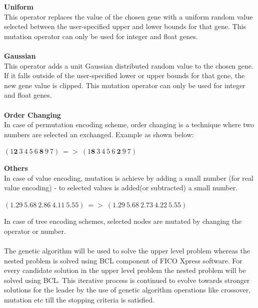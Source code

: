 \documentclass[a4paper, 12pt]{article}
\begin{document}
\textbf{Uniform}\\
This operator replaces the value of the chosen gene with a uniform random value selected between the user-specified upper and lower bounds for that gene. This mutation operator can only be used for integer and float genes.\\~\\
\textbf{Gaussian}\\
This operator adds a unit Gaussian distributed random value to the chosen gene. If it falls outside of the user-specified lower or upper bounds for that gene, the new gene value is clipped. This mutation operator can only be used for integer and float genes.\\~\\
\textbf{Order Changing}\\
In case of permutation encoding scheme, order changing is a technique where two numbers are selected an exchanged. Example as shown below:
\begin{center}
$\left(1 \mathbf{2}\ 3\ 4\ 5\ 6\ \mathbf{8}\ 9\ 7\right)\ =>\ \left(1 \mathbf{8}\ 3\ 4\ 5\ 6\ \mathbf{2}\ 9\ 7\right)$
\end{center}
\textbf{Others}\\
In case of value encoding, mutation is achieve by adding a small number (for real value encoding) - to selected values is added(or subtracted)
a small number.\\
\begin{center}
$(1.29\ 5.68\ 2.86\ 4.11\ 5.55)\ =>\ (1.29\ 5.68\ 2.73\ 4.22\ 5.55)$
\end{center}
In case of tree encoding schemes, selected nodes are mutated by changing the operator or number.\\~\\
The genetic algorithm will be used to solve the upper level problem whereas the nested problem is solved using BCL component of FICO Xpress software. For every candidate solution in the upper level problem the nested problem will be solved using BCL. This iterative process is continued to evolve towards stronger solutions for the leader by the use of genetic algorithm operations like crossover, mutation etc till the stopping criteria is satisfied.%
\newpage
\end{document}
